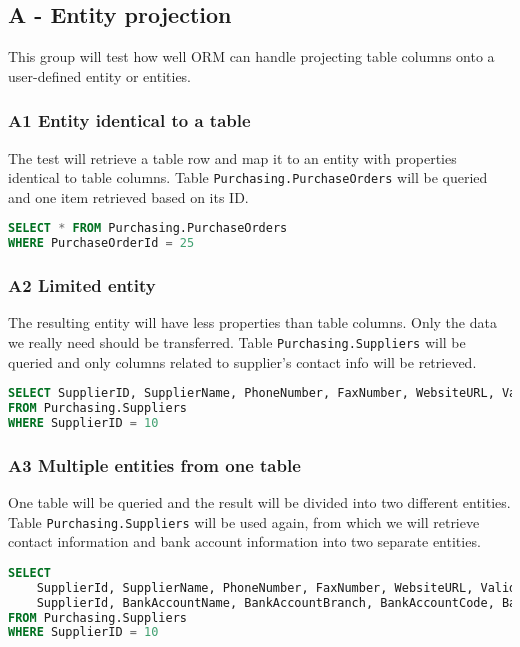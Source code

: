 \subsection{A - Entity projection}
This group will test how well ORM can handle projecting table columns onto a user-defined entity or entities.

\subsubsection*{A1 Entity identical to a table} \label{query:a1}
The test will retrieve a table row and map it to an entity with properties identical to table columns. 
Table \texttt{Purchasing.PurchaseOrders} will be queried and one item retrieved based on its ID.

\begin{lstlisting}[language=SQL]
SELECT * FROM Purchasing.PurchaseOrders 
WHERE PurchaseOrderId = 25
\end{lstlisting}

\subsubsection*{A2 Limited entity}
The resulting entity will have less properties than table columns. Only the data we really need should be transferred. 
Table \texttt{Purchasing.Suppliers} will be queried and only columns related to supplier's contact info will be retrieved.

\begin{lstlisting}[language=SQL]
SELECT SupplierID, SupplierName, PhoneNumber, FaxNumber, WebsiteURL, ValidFrom, ValidTo 
FROM Purchasing.Suppliers 
WHERE SupplierID = 10
\end{lstlisting}

\subsubsection*{A3 Multiple entities from one table}
One table will be queried and the result will be divided into two different entities. 
Table \texttt{Purchasing.Suppliers} will be used again, from which we will retrieve contact information and bank account information into two separate entities. 

\begin{lstlisting}[language=SQL]
SELECT 
    SupplierId, SupplierName, PhoneNumber, FaxNumber, WebsiteURL, ValidFrom, ValidTo, 
    SupplierId, BankAccountName, BankAccountBranch, BankAccountCode, BankAccountNumber, BankInternationalCode 
FROM Purchasing.Suppliers 
WHERE SupplierID = 10
\end{lstlisting}

